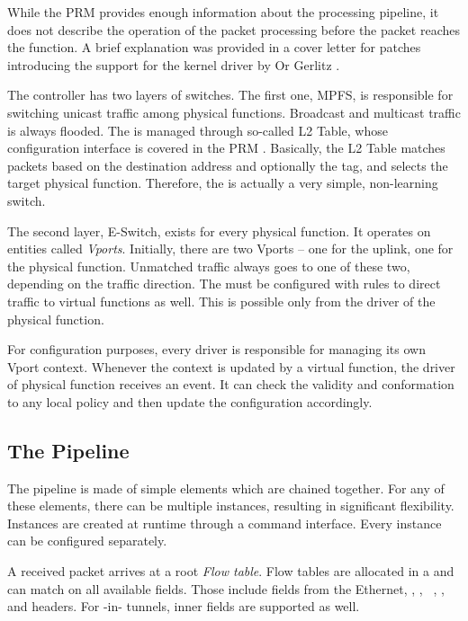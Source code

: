 While the PRM \cite{mlx-prm} provides enough information about the processing
pipeline, it does not describe the operation of the packet processing before
the packet reaches the  function. A brief explanation was provided in
a cover letter for patches introducing the  support for the kernel driver
by Or Gerlitz \cite{lwn-mlx-sriov}.

The controller has two layers of switches. The first one, \acrfull{MPFS}, is
responsible for switching unicast traffic among physical functions. Broadcast
and multicast traffic is always flooded. The  is managed through
so-called L2 Table, whose configuration interface is covered in the PRM
\cite{mlx-prm}. Basically, the L2 Table matches packets based on the destination
 address and optionally the  tag, and selects the target physical
function. Therefore, the  is actually a very simple, non-learning
switch.

The second layer, \acrfull{E-Switch}, exists for every physical function.
It operates on entities called \emph{Vports}. Initially, there are two Vports
-- one for the uplink, one for the physical function. Unmatched traffic always
goes to one of these two, depending on the traffic direction. The
 must be configured with rules to direct traffic to virtual
functions as well. This is possible only from the driver of the physical
function.

For configuration purposes, every driver is responsible for managing its
own Vport context. Whenever the context is updated by a virtual function, the
driver of physical function receives an event. It can check the validity and
conformation to any local policy and then update the configuration accordingly.

\subsection{The Pipeline}
\label{mlx:pipeline}

The pipeline is made of simple elements which are chained together. For any of
these elements, there can be multiple instances, resulting in significant
flexibility. Instances are created at runtime through a command interface.
Every instance can be configured separately.

A received packet arrives at a root \emph{Flow table}. Flow tables are allocated
in a  and can match on all available fields. Those include fields from the
Ethernet, , , \ , ,  and
 headers. For -in- tunnels, inner fields are supported as
well.


